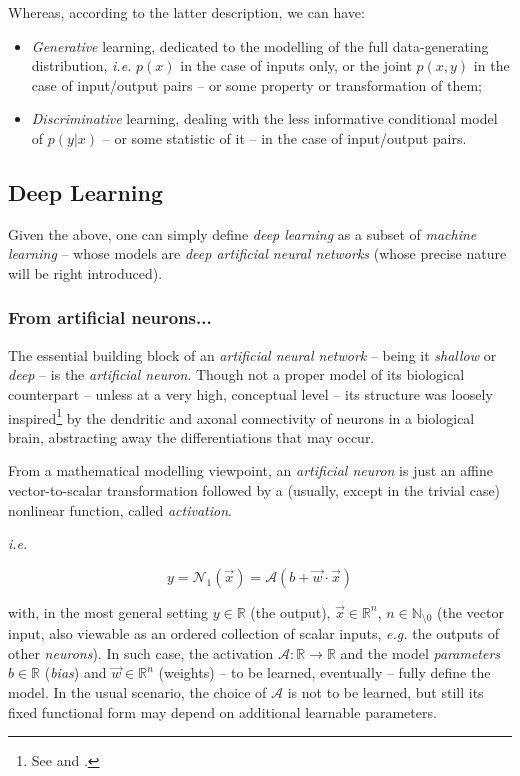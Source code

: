 Whereas, according to the latter description, we can have:
\begin{itemize}
    \item \textit{Generative} learning, dedicated to the modelling of the full data-generating distribution, \textit{i.e.} $p(x)$ in the case of inputs only, or the joint $p(x,y)$ in the case of input/output pairs -- or some property or transformation of them;
    \item \textit{Discriminative} learning, dealing with the less informative conditional model of $p(y|x)$ -- or some statistic of it -- in the case of input/output pairs.
\end{itemize}

\subsection{Deep Learning}

Given the above, one can simply define \textit{deep learning} as a subset of \textit{machine learning} -- whose models are \textit{deep artificial neural networks} (whose precise nature will be right introduced).

\subsubsection{From artificial neurons...}

The essential building block of an \textit{artificial neural network} -- being it \textit{shallow} or \textit{deep} -- is the \textit{artificial neuron}. Though not a proper model of its biological counterpart -- unless at a very high, conceptual level -- its structure was loosely inspired\footnote{See \cite{McCullochPitts1990ALC} and \cite{Rosenblatt1958ThePA}.} by the dendritic and axonal connectivity of neurons in a biological brain, abstracting away the differentiations that may occur.

From a mathematical modelling viewpoint, an \textit{artificial neuron} is just an affine vector-to-scalar transformation followed by a (usually, except in the trivial case) nonlinear function, called \textit{activation}.

\textit{i.e.}

$$y = \mathcal{N}_1(\vec{x}) = \mathcal{A}(b + \vec{w} \cdot \vec{x})$$

with, in the most general setting $y \in \mathbb{R}$ (the output), $\vec{x} \in \mathbb{R}^n$, $n \in \mathbb{N}_{\setminus0}$ (the vector input, also viewable as an ordered collection of scalar inputs, \textit{e.g.} the outputs of other \textit{neurons}). In such case, the activation $\mathcal{A}: \mathbb{R} \rightarrow \mathbb{R}$ and the model \textit{parameters} $b \in \mathbb{R}$ (\textit{bias}) and $\vec{w} \in \mathbb{R}^n$ (weights) -- to be learned, eventually -- fully define the model. In the usual scenario, the choice of $\mathcal{A}$ is not to be learned, but still its fixed functional form may depend on additional learnable parameters.

